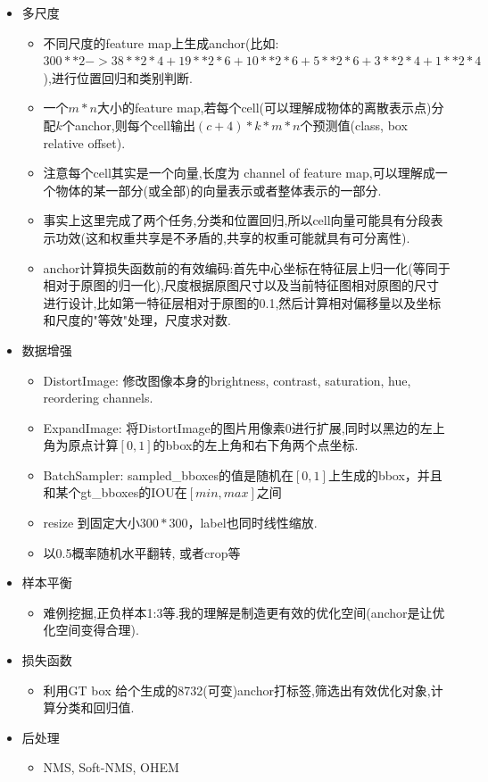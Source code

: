\documentclass[UTF8]{ctexart}
\begin{document}
\begin{itemize}
	\item 多尺度
	\begin{itemize}
		\item 不同尺度的feature map上生成anchor(比如:$300**2-> 38**2*4+19**2*6+10**2*6+5**2*6+3**2*4+1**2*4$),进行位置回归和类别判断.
		\item 一个$m*n$大小的feature map,若每个cell(可以理解成物体的离散表示点)分配$k$个anchor,则每个cell输出$(c+4)*k*m*n$个预测值(class, box relative offset).
		\item 注意每个cell其实是一个向量,长度为 channel of feature map,可以理解成一个物体的某一部分(或全部)的向量表示或者整体表示的一部分.
		\item 事实上这里完成了两个任务,分类和位置回归,所以cell向量可能具有分段表示功效(这和权重共享是不矛盾的,共享的权重可能就具有可分离性). 
		\item anchor计算损失函数前的有效编码:首先中心坐标在特征层上归一化(等同于相对于原图的归一化),尺度根据原图尺寸以及当前特征图相对原图的尺寸进行设计,比如第一特征层相对于原图的0.1,然后计算相对偏移量以及坐标和尺度的"等效"处理，尺度求对数.
	\end{itemize}

	\item 数据增强
	\begin{itemize}
		\item DistortImage: 修改图像本身的brightness, contrast, saturation, hue, reordering channels.
		\item ExpandImage: 将DistortImage的图片用像素0进行扩展,同时以黑边的左上角为原点计算$[0,1]$的bbox的左上角和右下角两个点坐标.
		\item BatchSampler: sampled\_bboxes的值是随机在$[0,1]$上生成的bbox，并且和某个gt\_bboxes的IOU在$[min, max]$之间
		\item resize 到固定大小$300*300$，label也同时线性缩放.
		\item 以0.5概率随机水平翻转, 或者crop等
	\end{itemize}

	\item 样本平衡
	\begin{itemize}
		\item 难例挖掘,正负样本1:3等.我的理解是制造更有效的优化空间(anchor是让优化空间变得合理).
	\end{itemize}
	
	\item 损失函数 
	\begin{itemize}
		\item 利用GT box 给个生成的8732(可变)anchor打标签,筛选出有效优化对象,计算分类和回归值.
	\end{itemize}

	\item 后处理
	\begin{itemize}
		\item NMS, Soft-NMS, OHEM
	\end{itemize}

\end{itemize}
\end{document}
